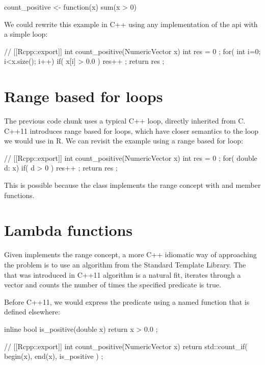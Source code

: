 \begin{example}
count_positive <- function(x){
  sum(x > 0)
}
\end{example}

We could rewrite this example in C++ using any implementation of the 
 api with a simple  loop: 

\begin{example}
// [[Rcpp::export]]
int count_positive(NumericVector x){
  int res = 0 ;
  for( int i=0; i<x.size(); i++){
    if( x[i] > 0.0 ) res++ ;
  }
  return res ;
}
\end{example}

\section{Range based for loops}

The previous code chunk uses a typical C++  loop, directly 
inherited from C. C++11 introduces range based for loops, which have 
closer semantics to the loop we would use in R. We can revisit the 
example using a range based for loop:

\begin{example}
// [[Rcpp::export]]
int count_positive(NumericVector x){
  int res = 0 ;
  for( double d: x){
    if( d > 0 ) res++ ;
  }
  return res ;
}
\end{example}

This is possible because the  class implements 
the range concept with  and  member functions. 

\section{Lambda functions}

Given  implements the range concept, a more C++ idiomatic
way of approaching the problem is to use an algorithm from the Standard
Template Library. The  that was introduced
in C++11 algorithm is a natural fit,  iterates through a vector
and counts the number of times the specified predicate is true. 

Before C++11, we would express the predicate using a named function that is defined
elsewhere: 

\begin{example}
inline bool is_positive(double x){
  return x > 0.0 ;
}

// [[Rcpp::export]]
int count_positive(NumericVector x){
  return std::count_if( begin(x), end(x), is_positive ) ;
}
\end{example}

